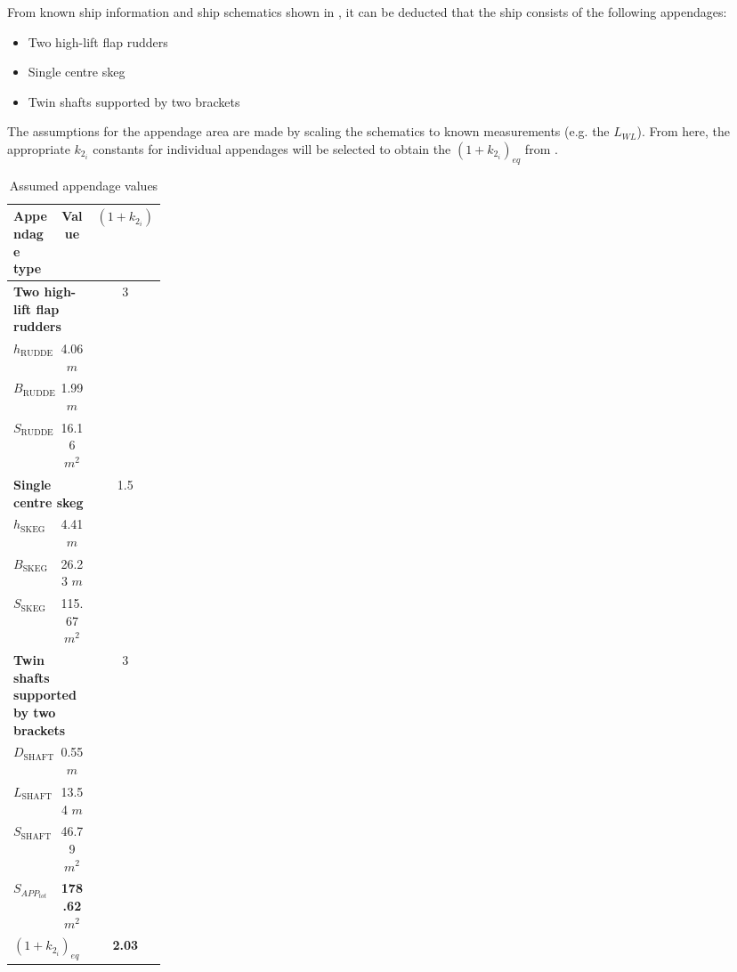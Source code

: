 From known ship information and ship schematics shown in , it can be deducted that the ship consists of the following appendages:

\begin{itemize}
    \setlength\itemsep{0em}
    \item Two high-lift flap rudders
    \item Single centre skeg
    \item Twin shafts supported by two brackets
\end{itemize}

The assumptions for the appendage area are made by scaling the schematics to known measurements (e.g. the $L_{WL}$). From here, the appropriate $k_{2_i}$ constants for individual appendages will be selected to obtain the $(1+k_{2_i})_{eq}$ from .

\begin{table}[h]
    \footnotesize
    \centering
    {\begin{tabular}{ p{0.2\linewidth} c c}
    \hline
    Appendage type & Value & $(1+k_{2_i})$ \\
    \hline
    \multicolumn{2}{l}{\textbf{Two high-lift flap rudders}} & 3\\
    \hline
    $h_{\text{RUDDER}}$ & 4.06 $m$\\
    $B_{\text{RUDDER}}$ & 1.99 $m$\\
    $S_{\text{RUDDER}}$ & 16.16 $m^2$\\
    \hline
    \multicolumn{2}{l}{\textbf{Single centre skeg}} & 1.5\\
    \hline
    $h_{\text{SKEG}}$ & 4.41 $m$\\
    $B_{\text{SKEG}}$ & 26.23 $m$\\
    $S_{\text{SKEG}}$ & 115.67 $m^2$\\
    \hline
    \multicolumn{2}{l}{\textbf{Twin shafts supported by two brackets}} & 3\\
    \hline
    $D_{\text{SHAFT}}$ & 0.55 $m$\\
    $L_{\text{SHAFT}}$ & 13.54 $m$\\
    $S_{\text{SHAFT}}$ & 46.79 $m^2$\\
    \hline
    \multicolumn{1}{l}{\textbf{$S_{APP_{tot}}$}} & \textbf{178.62} $m^2$ \\
    \multicolumn{2}{l}{\textbf{$(1+k_{2_i})_{eq}$}} & \textbf{2.03} \\
    \end{tabular}}
\caption{Assumed appendage values}\label{tbl:assume_appendage_dimension}
\end{table}

